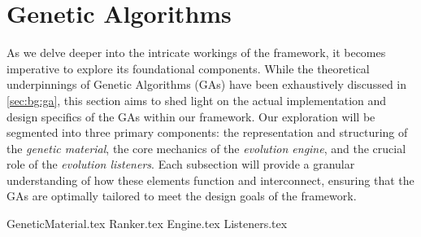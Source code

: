 \section{Genetic Algorithms}
\label{sec:genetic_algorithms}
  As we delve deeper into the intricate workings of the framework, it becomes 
  imperative to explore its foundational components.
  While the theoretical underpinnings of Genetic Algorithms (GAs) have been 
  exhaustively discussed in \vref{sec:bg:ga}, this section aims to shed light 
  on the actual implementation and design specifics of the GAs within our 
  framework.
  Our exploration will be segmented into three primary components: the 
  representation and structuring of the \emph{genetic material}, the core 
  mechanics of the \emph{evolution engine}, and the crucial role of the 
  \emph{evolution listeners}.
  Each subsection will provide a granular understanding of how these elements 
  function and interconnect, ensuring that the GAs are optimally tailored to 
  meet the design goals of the framework.
  
  {GeneticMaterial.tex}
  {Ranker.tex}
  {Engine.tex}    
  {Listeners.tex}
